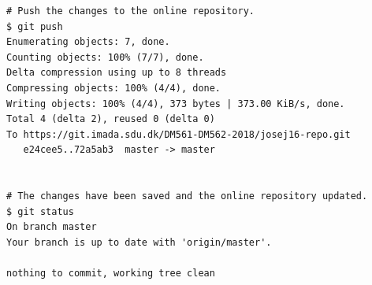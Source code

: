 \begin{lstlisting}
# Push the changes to the online repository.
$ git push
Enumerating objects: 7, done.
Counting objects: 100% (7/7), done.
Delta compression using up to 8 threads
Compressing objects: 100% (4/4), done.
Writing objects: 100% (4/4), 373 bytes | 373.00 KiB/s, done.
Total 4 (delta 2), reused 0 (delta 0)
To https://git.imada.sdu.dk/DM561-DM562-2018/josej16-repo.git
   e24cee5..72a5ab3  master -> master


# The changes have been saved and the online repository updated.
$ git status
On branch master
Your branch is up to date with 'origin/master'.

nothing to commit, working tree clean
\end{lstlisting}

